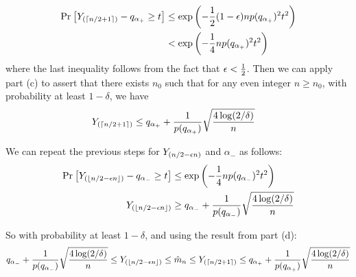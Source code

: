\documentclass[11pt]{article}
\newcommand{\1}{\mathbb{I}} %
\begin{document}
\begin{align}
	\text{Pr}_{}\left[ Y_{\left(  \lceil n/2 + 1 \rceil  \right)} - q_{\alpha_+} \geq t \right]
	&\leq \exp\left(  - \frac{1}{2} (1-\epsilon) n p(q_{\alpha_+})^2 t^2  \right) \\
	&< \exp\left(  - \frac{1}{4} n p(q_{\alpha_+})^2 t^2  \right)
\end{align}
where the last inequality follows from the fact that $\epsilon < \frac{1}{2}$. Then we can apply part (c) to assert that there exists $n_0$ such that for any even integer $n \geq n_0$, with probability at least $1 - \delta$, we have
\begin{align}
	Y_{\left(  \lceil n/2 + 1 \rceil  \right)} 
	&\leq q_{\alpha_+} + \frac{1}{p(q_{\alpha_+})} \sqrt{\frac{ 4 \log(2/\delta) }{ n }} 
\end{align}

We can repeat the previous steps for $Y_{\left(  n/2 - \epsilon n  \right)}$ and $\alpha_-$ as follows:
\begin{align}
	\text{Pr}_{}\left[ Y_{\left(  \lfloor n/2 - \epsilon n \rfloor  \right)} - q_{\alpha_-} \geq t \right]
		&\leq \exp\left(  - \frac{1}{4} n p(q_{\alpha_-})^2 t^2  \right) \\
	Y_{\left(  \lfloor n/2 - \epsilon n \rfloor  \right)}
		&\geq q_{\alpha_-} + \frac{1}{p(q_{\alpha_-})} \sqrt{\frac{ 4 \log(2/\delta) }{ n }}
\end{align}

So with probability at least $1 - \delta$, and using the result from part (d):
\begin{align}
	q_{\alpha_-} + \frac{1}{p(q_{\alpha_-})} \sqrt{\frac{ 4 \log(2/\delta) }{ n }} 
		\leq Y_{\left(  \lfloor n/2 - \epsilon n \rfloor  \right)} 
		\leq \hat m_n 
		\leq Y_{\left(  \lceil n/2 + 1 \rceil  \right)} 
		\leq q_{\alpha_+} + \frac{1}{p(q_{\alpha_+})} \sqrt{\frac{ 4 \log(2/\delta) }{ n }} 
\end{align}
\end{document}

